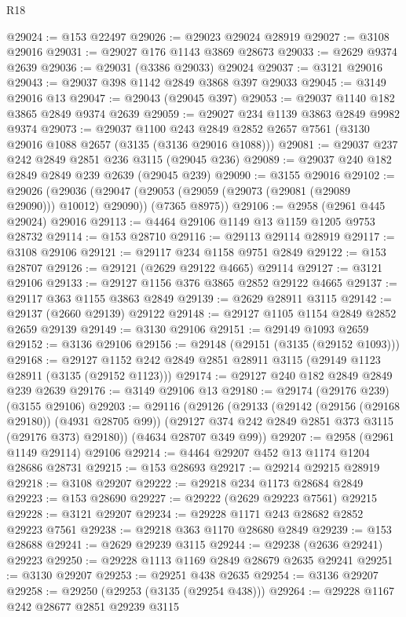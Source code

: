 \begin{lexlean}{R18}
\begin{coremodule}
@29024 := @153 @22497
@29026 := @29023 @29024 @28919
@29027 := @3108 @29016
@29031 := @29027 @176 @1143 @3869 @28673
@29033 := @2629 @9374 @2639
@29036 := @29031 (@3386 @29033) @29024
@29037 := @3121 @29016
@29043 := @29037 @398 @1142 @2849 @3868 @397 @29033
@29045 := @3149 @29016 @13
@29047 := @29043 (@29045 @397)
@29053 := @29037 @1140 @182 @3865 @2849 @9374 @2639
@29059 := @29027 @234 @1139 @3863 @2849 @9982 @9374
@29073 := @29037
    @1100
    @243
    @2849
    @2852
    @2657
    @7561
    (@3130 @29016 @1088 @2657 (@3135 (@3136 @29016 @1088)))
@29081 := @29037 @237 @242 @2849 @2851 @236 @3115 (@29045 @236)
@29089 := @29037 @240 @182 @2849 @2849 @239 @2639 (@29045 @239)
@29090 := @3155 @29016
@29102 := @29026
    (@29036
      (@29047 (@29053 (@29059 (@29073 (@29081 (@29089 @29090))) @10012) @29090))
      (@7365 @8975))
@29106 := @2958 (@2961 @445 @29024) @29016
@29113 := @4464 @29106 @1149 @13 @1159 @1205 @9753 @28732
@29114 := @153 @28710
@29116 := @29113 @29114 @28919
@29117 := @3108 @29106
@29121 := @29117 @234 @1158 @9751 @2849
@29122 := @153 @28707
@29126 := @29121 (@2629 @29122 @4665) @29114
@29127 := @3121 @29106
@29133 := @29127 @1156 @376 @3865 @2852 @29122 @4665
@29137 := @29117 @363 @1155 @3863 @2849
@29139 := @2629 @28911 @3115
@29142 := @29137 (@2660 @29139) @29122
@29148 := @29127 @1105 @1154 @2849 @2852 @2659 @29139
@29149 := @3130 @29106
@29151 := @29149 @1093 @2659
@29152 := @3136 @29106
@29156 := @29148 (@29151 (@3135 (@29152 @1093)))
@29168 := @29127 @1152 @242 @2849 @2851 @28911 @3115 (@29149 @1123 @28911 (@3135 (@29152 @1123)))
@29174 := @29127 @240 @182 @2849 @2849 @239 @2639
@29176 := @3149 @29106 @13
@29180 := @29174 (@29176 @239) (@3155 @29106)
@29203 := @29116
    (@29126
      (@29133
        (@29142 (@29156 (@29168 @29180)) (@4931 @28705 @99))
        (@29127 @374 @242 @2849 @2851 @373 @3115 (@29176 @373) @29180))
      (@4634 @28707 @349 @99))
@29207 := @2958 (@2961 @1149 @29114) @29106
@29214 := @4464 @29207 @452 @13 @1174 @1204 @28686 @28731
@29215 := @153 @28693
@29217 := @29214 @29215 @28919
@29218 := @3108 @29207
@29222 := @29218 @234 @1173 @28684 @2849
@29223 := @153 @28690
@29227 := @29222 (@2629 @29223 @7561) @29215
@29228 := @3121 @29207
@29234 := @29228 @1171 @243 @28682 @2852 @29223 @7561
@29238 := @29218 @363 @1170 @28680 @2849
@29239 := @153 @28688
@29241 := @2629 @29239 @3115
@29244 := @29238 (@2636 @29241) @29223
@29250 := @29228 @1113 @1169 @2849 @28679 @2635 @29241
@29251 := @3130 @29207
@29253 := @29251 @438 @2635
@29254 := @3136 @29207
@29258 := @29250 (@29253 (@3135 (@29254 @438)))
@29264 := @29228 @1167 @242 @28677 @2851 @29239 @3115

\end{coremodule}
\end{lexlean}
